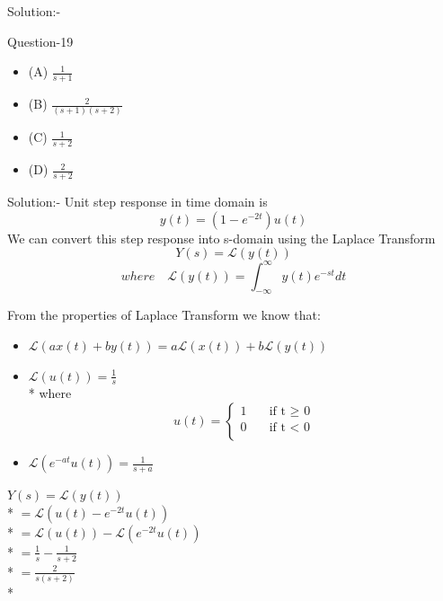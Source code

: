 \documentclass[journal,12pt,twocolumn]{IEEEtran}
\begin{document}
\begin{frame}{Solution:- }
\begin{frame}{}
\begin{frame}{Question-19 }
\begin{itemize}
\item (A) $\frac{1}{s+1}$
\item (B) $\frac{2}{(s+1)(s+2)}$
\item (C) $\frac{1}{s+2}$
\item (D) $\frac{2}{s+2}$
\end{itemize}

\end{frame}

\begin{frame}{Solution:- }
Unit step response in time domain is
\[y(t) = (1 - e^{-2t})u(t)\]
\vskip 0.5cm
We can convert this step response into s-domain using the Laplace Transform
\[Y(s) = \mathcal{L}(y(t))\]
\[where \quad \mathcal{L}(y(t))= \int_{-\infty}^{\infty} y(t)e^{-st} dt\]

\end{frame}

\begin{frame}{}
From the properties of Laplace Transform we know that:
\vskip 0.5cm
\begin{itemize}
\item $\mathcal{L}(ax(t) + by(t)) = a\mathcal{L}(x(t)) + b\mathcal{L}(y(t))$
\vskip 0.5cm
\item $\mathcal{L}(u(t)) = \frac{1}{s}$\\*
\vskip 0.2cm
where
\[   
u(t) = 
     \begin{cases}
       \text{1} &\quad\text{if t $\ge$ 0}\\
       \text{0} &\quad\text{if t < 0} \\ 
     \end{cases}
\]

\vskip 0.5cm
\item $\mathcal{L}(e^{-at}u(t)) = \frac{1}{s + a}$
\end{itemize}

\end{frame}

\begin{frame}{}

$Y(s) = \mathcal{L}(y(t))$\\*
\vskip 0.3cm
$= \mathcal{L}(u(t) - e^{-2t}u(t))$\\*
\vskip 0.3cm
$= \mathcal{L}(u(t)) - \mathcal{L}(e^{-2t}u(t))$\\*
\vskip 0.3cm
$= \frac{1}{s} - \frac{1}{s+2}$\\*
\vskip 0.3cm
$= \frac{2}{s(s+2)}$\\*


\end{frame}
\end{frame}
\end{frame}
\end{document}
